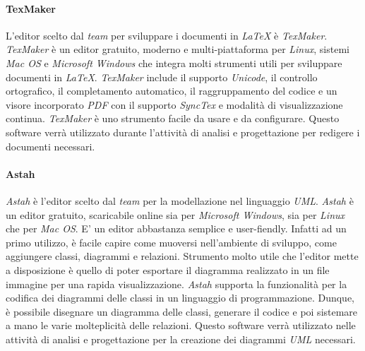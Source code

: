 \paragraph{TexMaker}
L'editor scelto dal \textit{team} per sviluppare i documenti in \textit{\LaTeX{}} è \textit{TexMaker}.
\textit{TexMaker} è un editor gratuito, moderno e multi-piattaforma per \textit{Linux}, sistemi \textit{Mac OS} e \textit{Microsoft Windows} che integra molti strumenti utili per sviluppare documenti in \textit{\LaTeX{}}.
\textit{TexMaker} include il supporto \textit{Unicode}, il controllo ortografico, il completamento automatico, il raggruppamento del codice e un visore incorporato \textit{PDF} con il supporto \textit{SyncTex} e modalità di visualizzazione continua.
\textit{TexMaker} è uno strumento facile da usare e da configurare. Questo software verrà utilizzato durante l'attività di analisi e progettazione per redigere i documenti necessari.

\paragraph{Astah}
\textit{Astah} è l'editor scelto dal \textit{team} per la modellazione nel linguaggio \textit{UML}.
\textit{Astah} è un editor gratuito, scaricabile online sia per \textit{Microsoft Windows}, sia per \textit{Linux} che per \textit{Mac OS}.
E' un editor abbastanza semplice e user-fiendly. Infatti ad un  primo utilizzo, è facile capire come muoversi nell'ambiente di sviluppo, come aggiungere classi, diagrammi e relazioni.
Strumento molto utile che l'editor mette a disposizione è quello di poter esportare il diagramma realizzato in un file immagine per una rapida visualizzazione.
\textit{Astah} supporta la funzionalità per la codifica dei diagrammi delle classi in un linguaggio di programmazione. Dunque, è possibile disegnare un diagramma delle classi, generare il codice e poi sistemare a mano le varie molteplicità delle relazioni. Questo software verrà utilizzato nelle attività di analisi e progettazione per la creazione dei diagrammi \textit{UML} necessari.



